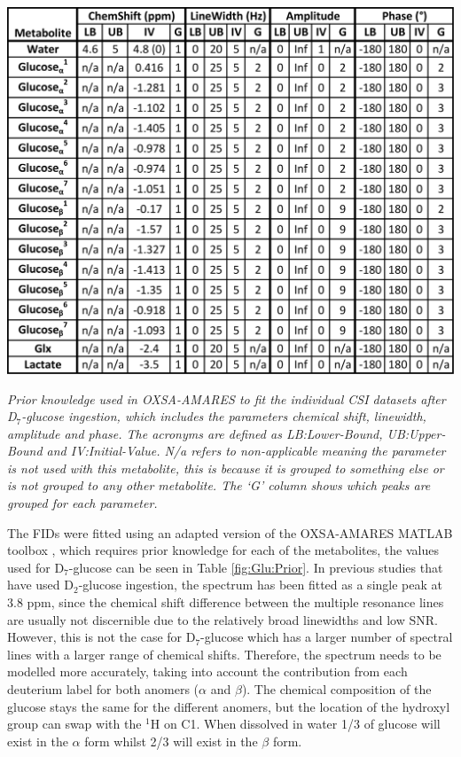 \begin{table}[H]
    \centering
    \includegraphics[width = 1\textwidth]{Figures/Glucose/Prior_Table.png}
    \caption{\textit{Prior knowledge used in OXSA-AMARES \cite{Vanhamme1997ImprovedKnowledge, Purvis2017OXSA:MATLAB} to fit the individual \ac{CSI} datasets after D$_7$-glucose ingestion, which includes the parameters chemical shift, linewidth, amplitude and phase. The acronyms are defined as LB:Lower-Bound, UB:Upper-Bound and IV:Initial-Value. N/a refers to non-applicable meaning the parameter is not used with this metabolite, this is because it is grouped to something else or is not grouped to any other metabolite. The `G' column shows which peaks are grouped for each parameter.}}
    \label{fig:Glu:Prior}
\end{table}

The \ac{FID}s were fitted using an adapted version of the OXSA-AMARES MATLAB toolbox \cite{Vanhamme1997ImprovedKnowledge, Purvis2017OXSA:MATLAB}, which requires prior knowledge for each of the metabolites, the values used for D$_7$-glucose can be seen in Table \ref{fig:Glu:Prior}. In previous studies that have used D$_2$-glucose ingestion, the spectrum has been fitted as a single peak at 3.8 ppm, since the chemical shift difference between the multiple resonance lines are usually not discernible due to the relatively broad linewidths and low SNR. However, this is not the case for D$_7$-glucose \cite{Govindaraju2000ProtonMetabolites} which has a larger number of spectral lines with a larger range of chemical shifts. Therefore, the spectrum needs to be modelled more accurately, taking into account the contribution from each deuterium label for both anomers ($\alpha$ and $\beta$). The chemical composition of the glucose stays the same for the different anomers, but the location of the hydroxyl group can swap with the $^1$H on C1. When dissolved in water 1/3 of glucose will exist in the $\alpha$ form whilst 2/3 will exist in the $\beta$ form.


